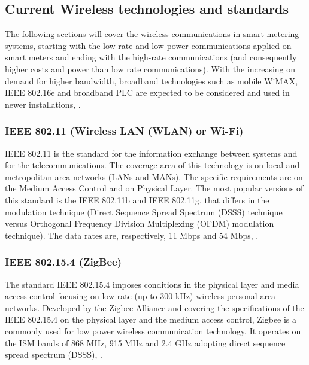 \subsection{Current Wireless technologies and standards}

The following sections will cover the wireless communications in smart metering systems, starting with the low-rate and low-power communications applied on smart meters and ending with the high-rate communications (and consequently higher costs and power than low rate communications). With the increasing on demand for higher bandwidth, broadband technologies such as mobile WiMAX, IEEE 802.16e and broadband PLC are expected to be considered and used in newer installations, \cite{Mohassel2014}.



\subsubsection{IEEE 802.11 (Wireless LAN (WLAN) or Wi-Fi)}

IEEE 802.11 is the standard for the information exchange between systems and for the telecommunications. The coverage area of this technology is on local and metropolitan area networks (LANs and MANs). The specific requirements are on the Medium Access Control and on Physical Layer. The most popular versions of this standard is the IEEE 802.11b and IEEE 802.11g, that differs in the modulation technique (Direct Sequence Spread Spectrum (DSSS) technique versus Orthogonal Frequency Division Multiplexing (OFDM) modulation technique). The data rates are, respectively, 11 Mbps and 54 Mbps, \cite{Usman2013, ieee2012}.



\subsubsection{IEEE 802.15.4 (ZigBee)}

The standard IEEE 802.15.4 imposes conditions in the physical layer and media access control focusing on low-rate (up to 300 kHz) wireless personal area networks. Developed by the Zigbee Alliance and covering the specifications of the IEEE 802.15.4 on the physical layer and the medium access control, Zigbee is a commonly used for low power wireless communication technology. It operates on the ISM bands of 868 MHz, 915 MHz and 2.4 GHz adopting direct sequence spread spectrum (DSSS), \cite{Usman2013}.

